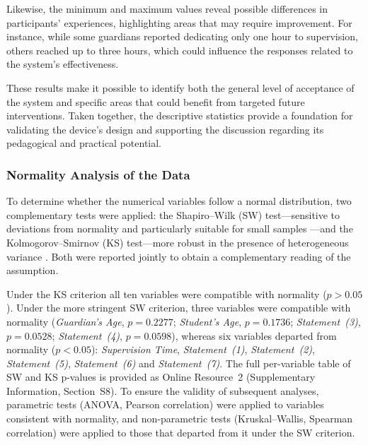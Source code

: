 Likewise, the minimum and maximum values reveal possible differences in participants’ experiences, highlighting areas that may require improvement. For instance, while some guardians reported dedicating only one hour to supervision, others reached up to three hours, which could influence the responses related to the system’s effectiveness.

These results make it possible to identify both the general level of acceptance of the system and specific areas that could benefit from targeted future interventions. Taken together, the descriptive statistics provide a foundation for validating the device’s design and supporting the discussion regarding its pedagogical and practical potential.

\subsubsection{Normality Analysis of the Data}
To determine whether the numerical variables follow a normal distribution, two complementary tests were applied: the Shapiro--Wilk (SW) test---sensitive to deviations from normality and particularly suitable for small samples \citep{Correa2025Simulation}---and the Kolmogorov--Smirnov (KS) test---more robust in the presence of heterogeneous variance \citep{Kobayashi2025Testing}. Both were reported jointly to obtain a complementary reading of the assumption.

Under the KS criterion all ten variables were compatible with normality ($p>0.05$). Under the more stringent SW criterion, three variables were compatible with normality (\textit{Guardian's Age}, $p=0.2277$; \textit{Student's Age}, $p=0.1736$; \textit{Statement~(3)}, $p=0.0528$; \textit{Statement~(4)}, $p=0.0598$), whereas six variables departed from normality ($p<0.05$): \textit{Supervision Time}, \textit{Statement~(1)}, \textit{Statement~(2)}, \textit{Statement~(5)}, \textit{Statement~(6)} and \textit{Statement~(7)}. The full per-variable table of SW and KS p-values is provided as Online Resource~2 (Supplementary Information, Section~S8). To ensure the validity of subsequent analyses, parametric tests (ANOVA, Pearson correlation) were applied to variables consistent with normality, and non-parametric tests (Kruskal--Wallis, Spearman correlation) were applied to those that departed from it under the SW criterion.

